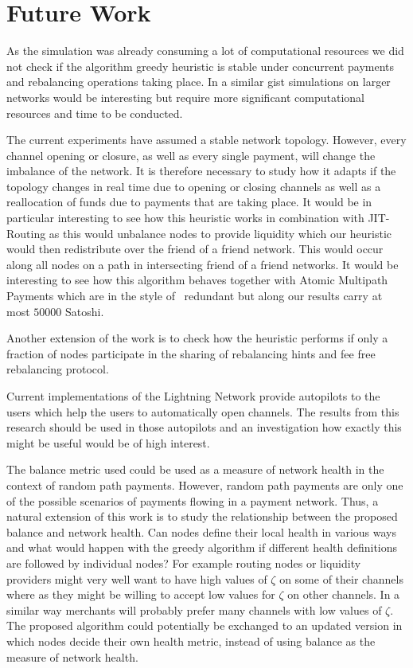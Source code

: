 \documentclass[conference]{IEEEtran}
\begin{document}
\section{Future Work}
\label{sec:future}

As the simulation was already consuming a lot of computational resources we did not check if the algorithm greedy heuristic is stable under concurrent payments and rebalancing operations taking place.
In a similar gist simulations on larger networks would be interesting but require more significant computational resources and time to be conducted.

The current experiments have assumed a stable network topology. 
However, every channel opening or closure, as well as every single payment, will change the imbalance of the network.
It is therefore necessary to study how it adapts if the topology changes in real time due to opening or closing channels as well as a reallocation of funds due to payments that are taking place.
It would be in particular interesting to see how this heuristic works in combination with JIT-Routing as this would unbalance nodes to provide liquidity which our heuristic would then redistribute over the friend of a friend network.
This would occur along all nodes on a path in intersecting friend of a friend networks.
It would be interesting to see how this algorithm behaves together with Atomic Multipath Payments which are in the style of~\cite{bagaria2019boomerang} redundant but along our results carry at most $50000$ Satoshi. 

Another extension of the work is to check how the heuristic performs if only a fraction of nodes participate in the sharing of rebalancing hints and fee free rebalancing protocol.

Current implementations of the Lightning Network provide autopilots to the users which help the users to automatically open channels.
The results from this research should be used in those autopilots and an investigation how exactly this might be useful would be of high interest.

The balance metric used could be used as a measure of network health in the context of random path payments. 
However, random path payments are only one of the possible scenarios of payments flowing in a payment network. 
Thus, a natural extension of this work is to 
study the relationship between the proposed balance and network health. Can nodes define their local health in various ways and what would happen with the greedy algorithm if different health definitions are followed by individual nodes?
For example routing nodes or liquidity providers might very well want to have high values of $\zeta$ on some of their channels where as they might be willing to accept low values for $\zeta$ on other channels.
In a similar way merchants will probably prefer many channels with low values of $\zeta$.
The proposed algorithm could potentially be exchanged to an updated version in which nodes decide their own health metric,
instead of using balance as the measure of network health.
\end{document}
